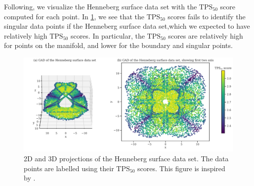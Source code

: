 Following, we visualize the Henneberg surface data set with the $\text{TPS}_{50}$ score computed for each point. In \cref{fig:gad-henneberg-3d-tps-50}, we see that the $\text{TPS}_{50}$ scores fails to identify the singular data points if the Henneberg surface data set,which we expected to have relatively high $\text{TPS}_{50}$ scores. In particular, the $\text{TPS}_{50}$ scores are relatively high for points on the manifold, and lower for the boundary and singular points.
\begin{figure}[H]
    \centering
    \includegraphics[width=\textwidth]{thesis/figures/gad-henneberg-3d-tps-50.pdf}
    \caption{2D and 3D projections of the Henneberg surface data set. The data points are labelled using their $\text{TPS}_{50}$ scores. This figure is inspired by \cite[Figure 3]{stolz2020geometric}.}
    \label{fig:gad-henneberg-3d-tps-50}
\end{figure}

